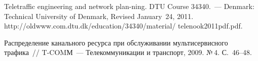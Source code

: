 \begin{multicols}{2}
{{\begin{thebibliography}{99}
Teletraffic engineering and network plan-\linebreak ning. DTU Course 34340.~--- Denmark:
Technical University of Denmark, Revised January~24, 2011. {\sf 
http://oldwww.com.dtu.dk/education/34340/material/ telenook2011pdf.pdf}.

\label{end\stat}

Распределение канального ресурса при обслуживании мультисервисного 
трафика~// T-COMМ~--- Телекоммуникации и транспорт, 2009. №\,4. 
С.~46--48. 


 \end{thebibliography}
}
}


\end{multicols}       